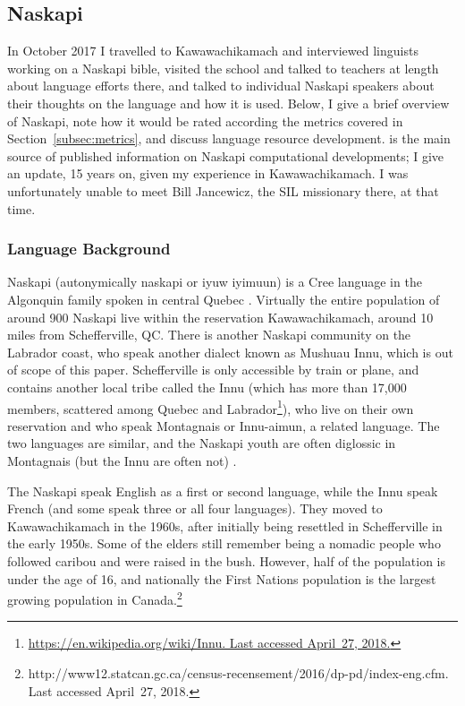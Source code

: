 
\subsection{Naskapi}
\label{sec:naskapi}

In October 2017 I travelled to Kawawachikamach and interviewed linguists working on a Naskapi bible, visited the school and talked to teachers at length about language efforts there, and talked to individual Naskapi speakers about their thoughts on the language and how it is used. Below, I give a brief overview of Naskapi, note how it would be rated according the metrics covered in Section~\ref{subsec:metrics}, and discuss language resource development. \citet{jancewicz2002applied} is the main source of published information on Naskapi computational developments; I give an update, 15 years on, given my experience in Kawawachikamach. I was unfortunately unable to meet Bill Jancewicz, the SIL missionary there, at that time. 

\subsubsection{Language Background}
\label{sec:naskapi-language-background}

Naskapi (autonymically  naskapi or  iyuw iyimuun) is a Cree language in the Algonquin family spoken in central Quebec \citep{MacKenzie-and-Jancewicz-1994}. Virtually the entire population of around 900 Naskapi live within the reservation Kawawachikamach, around 10 miles from Schefferville, QC. There is another Naskapi community on the Labrador coast, who speak another dialect known as Mushuau Innu, which is out of scope of this paper. Schefferville is only accessible by train or plane, and contains another local tribe called the Innu (which has more than 17,000 members, scattered among Quebec and Labrador\footnote{\href{https://en.wikipedia.org/wiki/Innu}{https://en.wikipedia.org/wiki/Innu. Last accessed April~27, 2018.}}), who live on their own reservation and who speak Montagnais or Innu-aimun, a related language. The two languages are similar, and the Naskapi youth are often diglossic in Montagnais (but the Innu are often not) \cite{macKenzie1980towards}.

The Naskapi speak English as a first or second language, while the Innu speak French (and some speak three or all four languages). They moved to Kawawachikamach in the 1960s, after initially being resettled in Schefferville in the early 1950s. Some of the elders still remember being a nomadic people who followed caribou and were raised in the bush. However, half of the population is under the age of 16, and nationally the First Nations population is the largest growing population in Canada.\footnote{http://www12.statcan.gc.ca/census-recensement/2016/dp-pd/index-eng.cfm. Last accessed April~27, 2018.}

